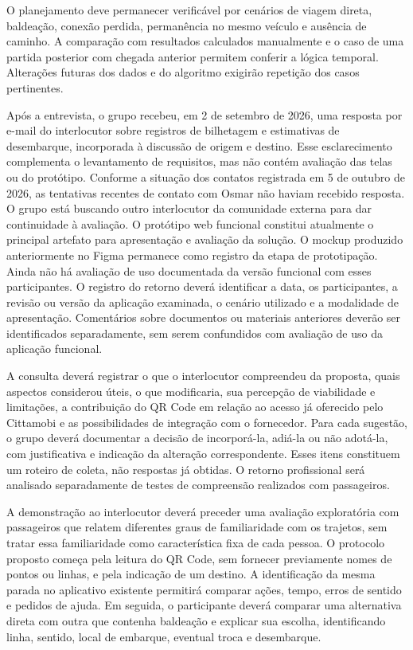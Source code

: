 \documentclass[12pt,oneside,a4paper,brazil,chapter=TITLE]{abntex2}
\begin{document}
O planejamento deve permanecer verificável por cenários de viagem direta, baldeação, conexão perdida, permanência no mesmo veículo e ausência de caminho. A comparação com resultados calculados manualmente e o caso de uma partida posterior com chegada anterior permitem conferir a lógica temporal. Alterações futuras dos dados e do algoritmo exigirão repetição dos casos pertinentes.

Após a entrevista, o grupo recebeu, em 2 de setembro de 2026, uma resposta por e-mail do interlocutor sobre registros de bilhetagem e estimativas de desembarque, incorporada à discussão de origem e destino. Esse esclarecimento complementa o levantamento de requisitos, mas não contém avaliação das telas ou do protótipo. Conforme a situação dos contatos registrada em 5 de outubro de 2026, as tentativas recentes de contato com Osmar não haviam recebido resposta. O grupo está buscando outro interlocutor da comunidade externa para dar continuidade à avaliação. O protótipo web funcional constitui atualmente o principal artefato para apresentação e avaliação da solução. O mockup produzido anteriormente no Figma permanece como registro da etapa de prototipação. Ainda não há avaliação de uso documentada da versão funcional com esses participantes. O registro do retorno deverá identificar a data, os participantes, a revisão ou versão da aplicação examinada, o cenário utilizado e a modalidade de apresentação. Comentários sobre documentos ou materiais anteriores deverão ser identificados separadamente, sem serem confundidos com avaliação de uso da aplicação funcional.

A consulta deverá registrar o que o interlocutor compreendeu da proposta, quais aspectos considerou úteis, o que modificaria, sua percepção de viabilidade e limitações, a contribuição do QR Code em relação ao acesso já oferecido pelo Cittamobi e as possibilidades de integração com o fornecedor. Para cada sugestão, o grupo deverá documentar a decisão de incorporá-la, adiá-la ou não adotá-la, com justificativa e indicação da alteração correspondente. Esses itens constituem um roteiro de coleta, não respostas já obtidas. O retorno profissional será analisado separadamente de testes de compreensão realizados com passageiros.

A demonstração ao interlocutor deverá preceder uma avaliação exploratória com passageiros que relatem diferentes graus de familiaridade com os trajetos, sem tratar essa familiaridade como característica fixa de cada pessoa. O protocolo proposto começa pela leitura do QR Code, sem fornecer previamente nomes de pontos ou linhas, e pela indicação de um destino. A identificação da mesma parada no aplicativo existente permitirá comparar ações, tempo, erros de sentido e pedidos de ajuda. Em seguida, o participante deverá comparar uma alternativa direta com outra que contenha baldeação e explicar sua escolha, identificando linha, sentido, local de embarque, eventual troca e desembarque.
\end{document}
